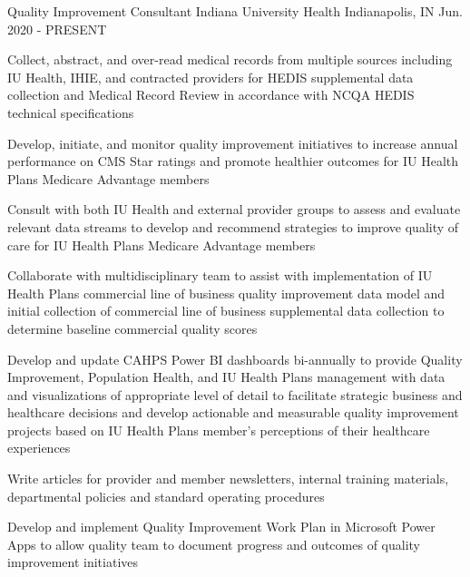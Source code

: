 

\begin{cventries}


  \cventry
    {Quality Improvement Consultant} %
    {Indiana University Health} %
    {Indianapolis, IN} %
    {Jun. 2020 - PRESENT} %
    {
      \begin{cvitems} %
      \item {Collect, abstract, and over-read medical records from multiple sources including IU Health, IHIE, and contracted providers for HEDIS supplemental data collection and Medical Record Review in accordance with NCQA HEDIS technical specifications}
        \item {Develop, initiate, and monitor quality improvement initiatives to increase annual performance on CMS Star ratings and promote healthier outcomes for IU Health Plans Medicare Advantage members}
        \item {Consult with both IU Health and external provider groups to assess and evaluate relevant data streams to develop and recommend strategies to improve quality of care for IU Health Plans Medicare Advantage members}
        \item {Collaborate with multidisciplinary team to assist with implementation of IU Health Plans commercial line of business quality improvement data model and initial collection of commercial line of business supplemental data collection to determine baseline commercial quality scores}
        \item {Develop and update CAHPS Power BI dashboards bi-annually to provide Quality Improvement, Population Health, and IU Health Plans management with data and visualizations of appropriate level of detail to facilitate strategic business and healthcare decisions and develop actionable and measurable quality improvement projects based on IU Health Plans member's perceptions of their healthcare experiences}
        \item {Write articles for provider and member newsletters, internal training materials, departmental policies and standard operating procedures }
        \item {Develop and implement Quality Improvement Work Plan in Microsoft Power Apps to allow quality team to document progress and outcomes of quality improvement initiatives}
  \end{cvitems}
    }



\end{cventries}
